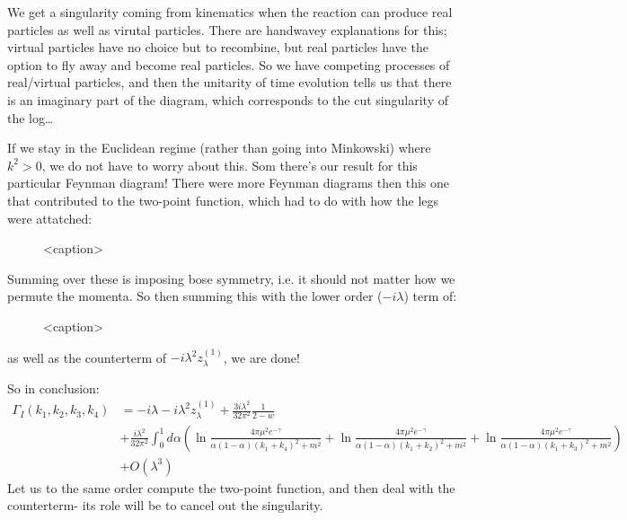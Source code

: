 We get a singularity coming from kinematics when the reaction can produce real particles as well as virutal particles. There are handwavey explanations for this; virtual particles have no choice but to recombine, but real particles have the option to fly away and become real particles. So we have competing processes of real/virtual particles, and then the unitarity of time evolution tells us that there is an imaginary part of the diagram, which corresponds to the cut singularity of the log\dots

If we stay in the Euclidean regime (rather than going into Minkowski) where $k^2 > 0$, we do not have to worry about this. Som there's our result for this particular Feynman diagram! There were more Feynman diagrams then this one that contributed to the two-point function, which had to do with how the legs were attatched:

\begin{figure}[htbp]
    \centering
    
    \caption{<caption>}
    \label{<label>}
\end{figure}

Summing over these is imposing bose symmetry, i.e. it should not matter how we permute the momenta. So then summing this with the lower order ($-i\lambda$) term of:
\begin{figure}[htbp]
    \centering
    
    \caption{<caption>}
    \label{<label>}
\end{figure}
as well as the counterterm of $-i\lambda^2 z^{(1)}_\lambda$, we are done!

So in conclusion:
\begin{equation}
    \begin{split}
        \Gamma_I(k_1, k_2, k_3, k_4) &= -i\lambda - i\lambda^2 z_\lambda^{(1)} + \frac{3i\lambda^2}{32\pi^2}\frac{1}{2-w} 
        \\ &+ \frac{i\lambda^2}{32\pi^2}\int_0^1 d\alpha \left(\ln\frac{4\pi \mu^2 e^{-\gamma}}{\alpha(1-\alpha)(k_1 + k_4)^2 + m^2} + \ln\frac{4\pi \mu^2 e^{-\gamma}}{\alpha(1-\alpha)(k_1 + k_2)^2 + m^2} + \ln\frac{4\pi \mu^2 e^{-\gamma}}{\alpha(1-\alpha)(k_1 + k_3)^2 + m^2}\right) 
        \\ &+ O(\lambda^3)
    \end{split}
\end{equation}
Let us to the same order compute the two-point function, and then deal with the counterterm- its role will be to cancel out the singularity.

